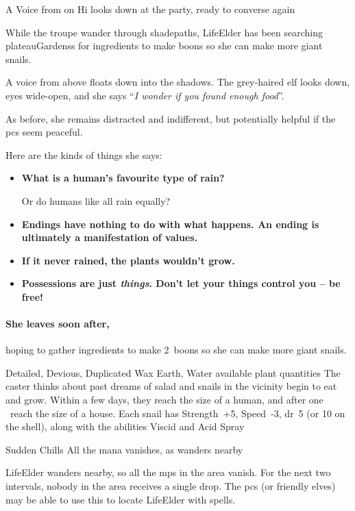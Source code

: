 \begin{multicols}{2}
{A Voice from on Hi}%
{ looks down at the party, ready to converse again}%

While the troupe wander through \gls{shadepaths}, \gls{LifeElder} has been searching \glspl{plateauGardens} for \glspl{ingredient} to make \glspl{boon} so she can make more giant snails.

\begin{boxtext}
  A voice from above floats down into the shadows.
  The grey-haired elf looks down, eyes wide-open, and she says ``\textit{I wonder if you found enough food}''.
\end{boxtext}

As before, she remains distracted and indifferent, but potentially helpful if the \glspl{pc} seem peaceful.

Here are the kinds of things she says:

\begin{itemize}
  \item[\adforn{54}]\bf
  What is a human's favourite type of rain?

  Or do humans like all rain equally?
  \item[\adforn{54}]\bf
  Endings have nothing to do with what happens.
  An ending is ultimately a manifestation of values.
  \item[\adforn{54}]\bf
  If it never rained, the plants wouldn't grow.
  \item[\adforn{54}]\bf
  Possessions are just \emph{things}.
  Don't let your things control you -- be free!
\end{itemize}

\paragraph{She leaves soon after,}
hoping to gather \glspl{ingredient} to make 2~\glspl{boon} so she can make more giant snails.

  {Detailed, Devious, Duplicated}%
  {Wax}%
  {Earth, Water}%
  {available plant quantities}%
  {The caster thinks about past dreams of salad and  snails in the vicinity begin to eat and grow.
  Within a few days, they reach the size of a human, and after one \showOnset\ reach the size of a house.
  Each snail has Strength~+5, Speed~-3, \gls{dr}~5 (or 10 on the shell), along with the abilities Viscid and Acid Spray}%
  {}


{Sudden Chills}%
{All the mana vanishes, as  wanders nearby}%

\Gls{LifeElder} wanders nearby, so all the \glspl{mp} in the area vanish.
For the next two \glspl{interval}, nobody in the \gls{area} receives a single drop.
The \glspl{pc} (or friendly elves) may be able to use this to locate \gls{LifeElder} with spells.%

\end{multicols}
